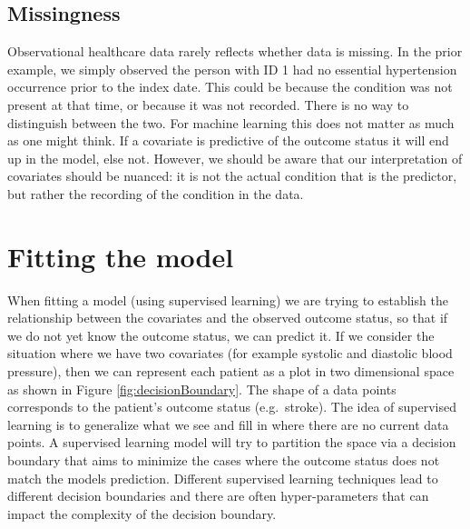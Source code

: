 \documentclass[11pt]{book}
\theoremstyle{definition}
\theoremstyle{definition}
\theoremstyle{definition}
\theoremstyle{remark}
\begin{document}
\hypertarget{missingness}{%
\subsection{Missingness}\label{missingness}}

Observational healthcare data rarely reflects whether data is missing. In the prior example, we simply observed the person with ID 1 had no essential hypertension occurrence prior to the index date. This could be because the condition was not present at that time, or because it was not recorded. There is no way to distinguish between the two. For machine learning this does not matter as much as one might think. If a covariate is predictive of the outcome status it will end up in the model, else not. However, we should be aware that our interpretation of covariates should be nuanced: it is not the actual condition that is the predictor, but rather the recording of the condition in the data. 

\hypertarget{modelFitting}{%
\section{Fitting the model}\label{modelFitting}}

When fitting a model (using supervised learning) we are trying to establish the relationship between the covariates and the observed outcome status, so that if we do not yet know the outcome status, we can predict it. If we consider the situation where we have two covariates (for example systolic and diastolic blood pressure), then we can represent each patient as a plot in two dimensional space as shown in Figure \ref{fig:decisionBoundary}. The shape of a data points corresponds to the patient's outcome status (e.g.~stroke). The idea of supervised learning is to generalize what we see and fill in where there are no current data points. A supervised learning model will try to partition the space via a decision boundary that aims to minimize the cases where the outcome status does not match the models prediction. Different supervised learning techniques lead to different decision boundaries and there are often hyper-parameters that can impact the complexity of the decision boundary. 
\end{document}
